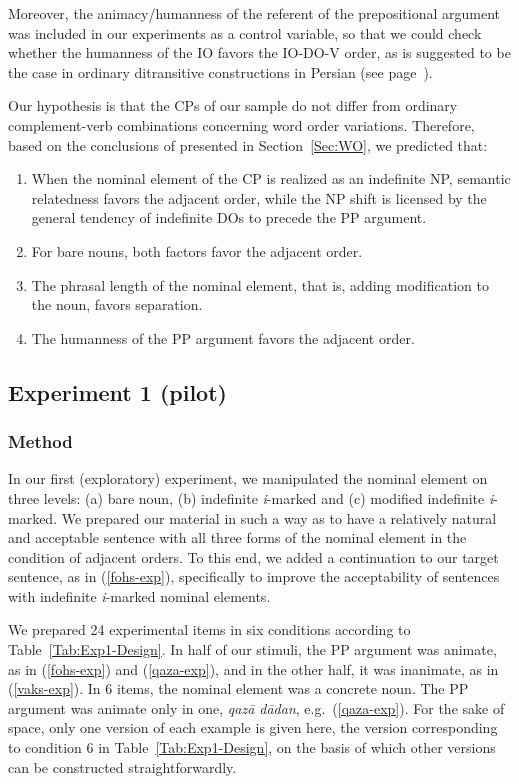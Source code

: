 \documentclass[output=paper]{langsci/langscibook}
\begin{document}
\begin{sloppypar}
  Moreover, the animacy/humanness of the referent of the prepositional
  argument was included in our experiments as a control variable, so
  that we could check whether the humanness of the IO favors the
  IO-DO-V order, as is suggested to be the case in ordinary
  ditransitive constructions in Persian (see
  page~\pageref{ListWOClaims}).
\end{sloppypar}
\begin{sloppypar}
  Our hypothesis is that the CPs of our sample do not differ from
  ordinary complement-verb combinations concerning word order
  variations. Therefore, based on the conclusions of
  \citet{FaghiriPhd} presented in Section~\ref{Sec:WO}, we predicted
  that:
\end{sloppypar}
\begin{enumerate}
	\item When the nominal element of the CP is realized as an indefinite NP, semantic relatedness favors the adjacent order, while the NP shift is licensed by the general tendency of indefinite DOs to precede the PP argument. 
	\item For bare nouns, both factors favor the adjacent order. 
	\item The phrasal length of the nominal element, that is, adding modification to the noun, favors separation.
	\item The humanness of the PP argument favors the adjacent order. 
\end{enumerate}

\subsection{Experiment 1 (pilot)}
\subsubsection{Method}
In our first (exploratory) experiment, we manipulated the nominal element on three levels: (a) bare noun, (b) indefinite \textit{i}-marked and (c) modified indefinite \textit{i}-marked. We prepared our material in such a way as to have a relatively natural and acceptable sentence  with all three forms of the nominal element in the condition of adjacent orders. To this end, we added a continuation to our target sentence, as in (\ref{fohs-exp}), specifically to improve the acceptability of sentences with indefinite \textit{i}-marked nominal elements.

We prepared 24 experimental items in six conditions according to Table~\ref{Tab:Exp1-Design}. In half of our stimuli, the PP argument was animate, as in (\ref{fohs-exp}) and (\ref{qaza-exp}), and in the other half, it was inanimate, as in (\ref{vaks-exp}). 
In 6 items, the nominal element was a concrete noun. The PP argument was animate only in one, \textit{qaz\=a d\=adan}, e.g.~(\ref{qaza-exp}). For the sake of space, only one version of each example is given here, the version corresponding to condition 6 in Table~\ref{Tab:Exp1-Design}, on the basis of which other versions can be constructed straightforwardly. 
\end{document}

